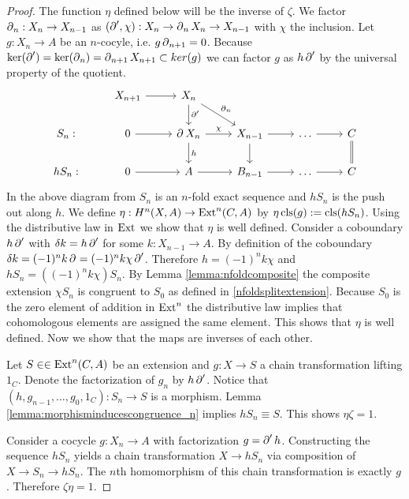 \begin{proof}
The function $\eta$ defined below will be the inverse of $\zeta$.
We factor $\operatorname{\partial}_{n}:X_n \to X_{n-1}$ as $(\operatorname{\partial}_{}',\chi): X_n \to \operatorname{\partial}_{n}X_n \to X_{n-1}$ with $\chi$ the inclusion.
Let $g: X_n \to A$ be an $n$-cocyle, i.e. $g \operatorname{\partial}_{n+1} = 0$.
Because $\ker (\operatorname{\partial}_{}') = \ker(\operatorname{\partial}_{n}) = \operatorname{\partial}_{n+1}X_{n+1} \subset ker(g)$ we can factor $g$ as $h\operatorname{\partial}_{}'$ by the universal property of the quotient.
\begin{equation*}
\begin{tikzcd}
&
X_{n+1} \arrow{r}&
X_n \arrow{d}{\bdd{}'} \arrow{rd}{\bdd{n}}
\\
S_n:&
0 \arrow{r} &
\bdd{}X_n\arrow{r}{\chi} \arrow{d}{h}&
X_{n-1} \arrow{r} \arrow{d}&
\dots \arrow{r}&
C \arrow[d,equal]
\\
hS_n:&
0 \arrow{r}&
A \arrow{r}
&
B_{n-1} \arrow{r}&
\dots \arrow{r}&
C
\end{tikzcd}
\end{equation*}
In the above diagram from \cite[p. 89]{maclane} $S_n$ is an $n$-fold exact sequence and $hS_n$ is the push out along $h$.
We define $\eta:H^n(X,A)\to \operatorname{Ext}^{n}(C,A)$ by $\eta \operatorname{cls}(g) := \operatorname{cls}(hS_n)$.
Using the distributive law in $\operatorname{Ext}^{}$ we show that $\eta$ is well defined.
Consider a coboundary $h\operatorname{\partial}_{}'$ with $\delta k = h\operatorname{\partial}_{}'$ for some $k:X_{n-1}\to A$.
By definition of the coboundary
$\delta k = (-1)^n k \operatorname{\partial}_{} = (-1)^n k \chi\operatorname{\partial}_{}'$.
Therefore $h = (-1)^n k \chi$ and $h S_n = ((-1)^n k \chi)S_n$.
By Lemma \ref{lemma:nfoldcomposite} the composite extension $\chi S_n$ is congruent to $ S_0$ as defined in \eqref{nfoldsplitextension}.
Because $S_0$ is the zero element of addition in $\operatorname{Ext}^{n}$ the distributive law implies that cohomologous elements are assigned the same element.
This shows that $\eta$ is well defined.
Now we show that the maps are inverses of each other.

Let $S\in\in \operatorname{Ext}^{n}(C,A)$ be an extension and $g:X \to S$ a chain transformation lifting $1_C$.
Denote the factorization of $g_n$ by  $h \operatorname{\partial}_{}'$.
Notice that $(h, g_{n-1},\dots,g_0,1_C):S_n \to S$ is a morphism.
Lemma \ref{lemma:morphisminducescongruence_n} implies $hS_n \equiv S$.
This shows $\eta\zeta = 1$.

Consider a cocycle $g:X_n \to A$ with factorization $g = \operatorname{\partial}_{}'h$. 
Constructing the sequence $hS_n$ yields a chain transformation $X \to hS_n$ via composition of $X\to S_n \to hS_n$.
The $n$th homomorphism of this chain transformation is exactly $g$.
Therefore $\zeta\eta = 1$.


\end{proof}
